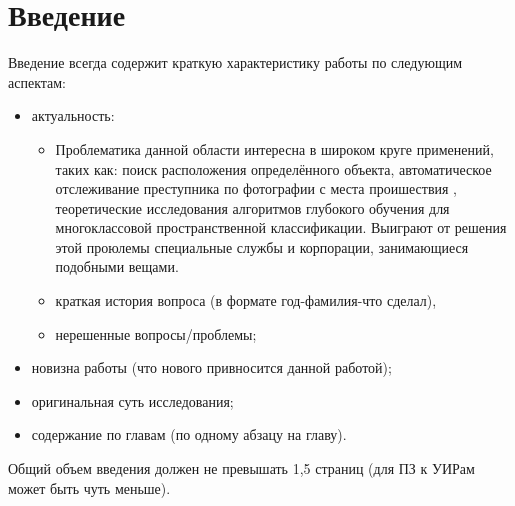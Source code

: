 \chapter*{Введение}
\label{sec:afterwords}

Введение всегда содержит краткую характеристику работы по следующим аспектам:

\begin{itemize}
	\item актуальность:
	\begin{itemize}
		\item Проблематика данной области интересна в широком круге применений, таких как: 
		поиск расположения определённого объекта, автоматическое отслеживание преступника по фотографии с места проишествия , теоретические исследования алгоритмов глубокого обучения для многоклассовой пространственной классификации. Выиграют от решения этой проюлемы специальные службы и корпорации, занимающиеся подобными вещами.
		\item краткая история вопроса (в формате год-фамилия-что сделал),
		\item нерешенные вопросы/проблемы;
	\end{itemize}
	\item новизна работы (что нового привносится данной работой);
	\item оригинальная суть исследования;
	\item содержание по главам (по одному абзацу на главу).
\end{itemize}

Общий объем введения должен не превышать 1,5 страниц (для ПЗ к УИРам может быть чуть меньше).


